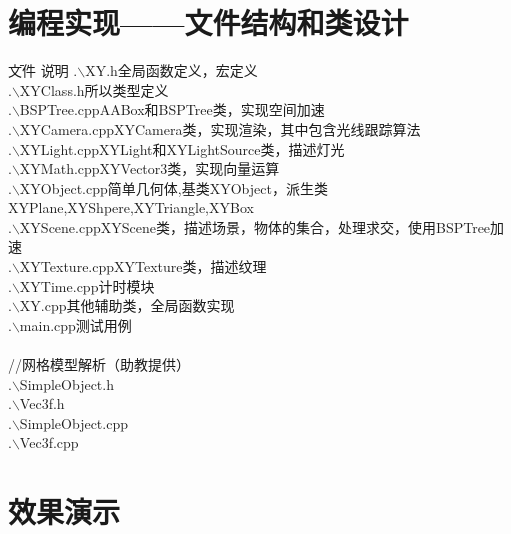 \documentclass{article}
\begin{document}
\section{编程实现——文件结构和类设计}
\begin{tabbing}
\hspace*{2em}\=文件\hspace*{8em} \=说明\hspace*{20em}\kill
\>.$\backslash$XY.h\>全局函数定义，宏定义\\
\>.$\backslash$XYClass.h\>所以类型定义\\
\>.$\backslash$BSPTree.cpp\>AABox和BSPTree类，实现空间加速\\
\>.$\backslash$XYCamera.cpp\>XYCamera类，实现渲染，其中包含光线跟踪算法\\
\>.$\backslash$XYLight.cpp\>XYLight和XYLightSource类，描述灯光\\
\>.$\backslash$XYMath.cpp\>XYVector3类，实现向量运算\\
\>.$\backslash$XYObject.cpp\>简单几何体,基类XYObject，派生类XYPlane,XYShpere,XYTriangle,XYBox\\
\>.$\backslash$XYScene.cpp\>XYScene类，描述场景，物体的集合，处理求交，使用BSPTree加速\\
\>.$\backslash$XYTexture.cpp\>XYTexture类，描述纹理\\
\>.$\backslash$XYTime.cpp\>计时模块\\
\>.$\backslash$XY.cpp\>其他辅助类，全局函数实现\\
\>.$\backslash$main.cpp\>测试用例\\\\
\>//网格模型解析（助教提供）\\
\>.$\backslash$SimpleObject.h\>\\
\>.$\backslash$Vec3f.h\>\\
\>.$\backslash$SimpleObject.cpp\>\\
\>.$\backslash$Vec3f.cpp\>
\end{tabbing}
\section{效果演示}
\end{document}
